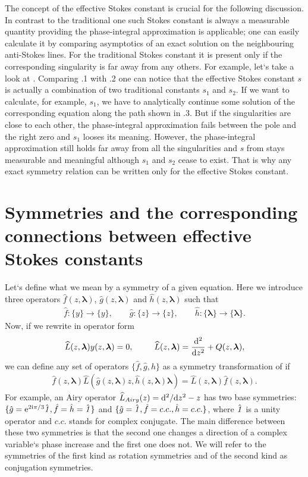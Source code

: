 \documentclass[12pt]{iopart}
\def\f{\hat{f}}
\def\g{\hat{g}}
\def\h{\hat{h}}
\def\L{\widehat{L}}
\def\lmbd{\bm{\lambda}}
\def\unity{\hat{\it 1}}
\begin{document}
The concept of the effective Stokes constant is crucial for the following discussion. 
In contrast to the traditional one such Stokes constant is always a measurable quantity
providing the phase-integral approximation is applicable; one 
can easily calculate it by comparing asymptotics of an exact solution on the 
neighbouring anti-Stokes lines. For the traditional Stokes constant it is present only if the
corresponding singularity is far away from any others. 
For example, let`s take a look at . Comparing .1 with .2
one can notice that the effective Stokes constant $s$ is actually a combination of
two traditional constants $s_1$ and $s_2$. If we want to calculate, for example, $s_1$, we have to analytically
continue some solution of the corresponding equation along the path shown in  .3. But
if the singularities are close to each other, the phase-integral approximation fails between the pole
and the right zero and $s_1$ looses its meaning. However, the phase-integral approximation still holds
far away from all the singularities and $s$ from  stays measurable and meaningful
although $s_1$ and $s_2$ cease to exist. That is why any exact symmetry relation can be written only 
for the effective Stokes constant.

\section{Symmetries and the corresponding connections between effective Stokes constants \label{sec:smmtrs}}
Let`s define what we mean by a symmetry of a given equation. Here we introduce three operators
$\f(z,\lmbd)$, $\g(z,\lmbd)$ and $\h(z,\lmbd)$ such that
\begin{eqnarray}
\f:\{y\} \rightarrow \{y\}, \qquad
\g:\{z\} \rightarrow \{z\}, \qquad
\h:\{\lmbd\} \rightarrow \{\lmbd\}.
\end{eqnarray}
Now, if we rewrite  in operator form
\begin{eqnarray}
\L(z,\lmbd)y(z,\lmbd)=0, \qquad \L(z,\lmbd)=\frac{\rmd^2}{\rmd z^2} + Q(z,\lmbd),   \label{eq:L}
\end{eqnarray}
we can define any set of operators $\{\f,\g,\h\}$ as a symmetry transformation of  if
\begin{eqnarray}
\f(z,\lmbd)\L(\g(z,\lmbd)z,\h(z,\lmbd)\lmbd)=\L(z,\lmbd)\f(z,\lmbd).   \label{eq:symdef}
\end{eqnarray}
For example, an Airy operator $\L_{Airy}(z) = \rmd^2/\rmd z^2 - z$ has two base symmetries: 
$\{\g=\rme^{2 \rmi \pi/3}\unity,\f=\h=\unity\}$ and $\{\g=\unity,\f=c.c.,\h=c.c.\}$, where $\unity$ 
is a unity operator and $c.c.$ stands 
for complex conjugate. The main difference between these two symmetries is that the second 
one changes a direction of a complex variable`s phase increase and the first one does not. 
We will refer to the symmetries of the first kind as rotation symmetries and of the second 
kind as conjugation symmetries.
\end{document}
